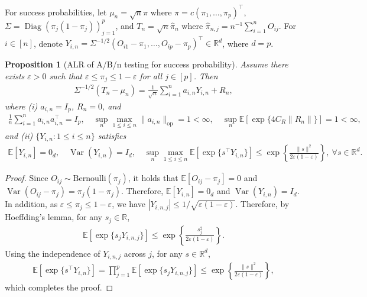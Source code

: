 \documentclass[12pt]{article}
\newcommand{\op}{\mathrm{op}}
\newtheorem{proposition}{Proposition}[section]
\newcommand{\Var}{\operatorname{Var}}
\newcommand{\real}{\mathbb{R}}
\newcommand{\Ee}{{\mathbb{E}}}
\begin{document}
\begin{appendices}
For success probabilities, let $\mu_n=\sqrt {n} \pi$ where $\pi=c(\pi_1, \ldots, \pi_p)^\top$, $\Sigma=\operatorname{Diag}(\pi_j(1-\pi_j))_{j=1}^p$, and $T_{n}=\sqrt{n}\widehat\pi_n$ where $\widehat\pi_{n,j}=n^{-1}\sum_{i=1}^n O_{ij}$. 
For $i\in[n]$, denote $Y_{i,n}=\Sigma^{-1/2}(O_{i1}-\pi_1,\ldots,O_{ip}-\pi_p)^\top\in\mathbb R^d$, where $d=p$.
\begin{proposition}[ALR of A/B/n testing for success probability]\label{prop:ALR.ABn.prob}
Assume there exists $\varepsilon>0$ such that $\varepsilon \le \pi_j \le 1-\varepsilon$ for all $j\in[p]$.
Then
\begin{align*}
  \Sigma^{-1/2}(T_n - \mu_n)
  =
  \frac{1}{\sqrt{n}} \sum_{i=1}^n a_{i,n} Y_{i,n} + R_n,
\end{align*}
where (i) $a_{i,n}=I_p$, $R_n=0$, and 
\begin{align*}
  \frac{1}{n}\sum_{i=1}^n a_{i,n}a_{i,n}^{\top}=I_p,
  \quad
  \sup_{n}\max_{1\le i\le n}\|a_{i,n}\|_{\op} = 1 < \infty,
  \quad
  \sup_n\Ee\left[\exp\{4C_R\|R_n\|\}\right] = 1 <\infty,
\end{align*}
and (ii) $\{Y_{i,n}:1\le i\le n\}$ satisfies
\begin{align*}
  \Ee[Y_{i,n}]=0_d,
  \quad
  \Var(Y_{i,n})=I_d,
  \quad
  \sup_{n}\max_{1\le i\le n}
  \Ee[\exp\{s^\top Y_{i,n}\}]
  \le
  \exp\left\{\frac{\|s\|^2}{2\varepsilon(1-\varepsilon)}\right\}, ~
  \forall s\in\real^d.
\end{align*}
\end{proposition}


\begin{proof}\label{proof:prop:ALR.ABn.prob}    
Since $O_{ij}\sim \mathrm{Bernoulli}(\pi_j)$, it holds that $\Ee[O_{ij}-\pi_j] = 0$ and $\Var(O_{ij}-\pi_j)=\pi_j(1-\pi_j)$.
Therefore, $\Ee[Y_{i,n}]=0_d$ and $\Var(Y_{i,n})=I_d$.
In addition, as $\varepsilon \le \pi_j \le 1 - \varepsilon$, we have $|Y_{i,n,j}| \le 1/\sqrt{\varepsilon(1-\varepsilon)}$. 
Therefore, by Hoeffding's lemma, for any $s_j \in \real$,
\begin{align*}
    \Ee[\exp\{s_j Y_{i,n,j}\}]
    \le
    \exp\left\{
        \frac{s_j^2}{2\varepsilon(1-\varepsilon)}
    \right\}.
\end{align*}
Using the independence of $Y_{i,n,j}$ across $j$, for any $s\in\real^d$,
\begin{align*}
    \Ee[\exp\{s^\top Y_{i,n}\}]
    =
    \prod_{j=1}^p
    \Ee[\exp\{s_jY_{i,n,j}\}] 
    \le
    \exp\left\{
        \frac{\|s\|^2}{2\varepsilon(1-\varepsilon)}
    \right\},
\end{align*}
which completes the proof.
\end{proof}



\end{appendices}
\end{document}
